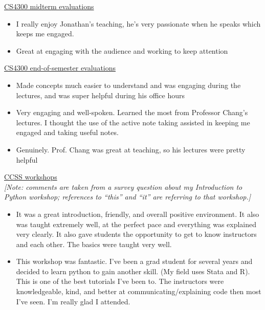 \documentclass[11pt,letterpaper]{article}
\begin{document}

\noindent\underline{CS4300 midterm evaluations}
\begin{itemize}
    \item I really enjoy Jonathan's teaching, he's very passionate when he speaks which keeps me engaged.
    \item Great at engaging with the audience and working to keep attention
\end{itemize}

\noindent\underline{CS4300 end-of-semester evaluations}
\begin{itemize}
    \item Made concepts much easier to understand and was engaging during the lectures, and was super helpful during his office hours
    \item Very engaging and well-spoken. Learned the most from Professor Chang's lectures. I thought the use of the active note taking assisted in keeping me engaged and taking useful notes.
    \item Genuinely. Prof. Chang was great at teaching, so his lectures were pretty helpful
\end{itemize}

\noindent\underline{CCSS workshops}\\
\emph{[Note: comments are taken from a survey question about my Introduction to Python workshop; references to ``this'' and ``it'' are referring to that workshop.]}
\begin{itemize}
    \item It was a great introduction, friendly, and overall positive environment. It also was taught extremely well, at the perfect pace and everything was explained very clearly. It also gave students the opportunity to get to know instructors and each other. The basics were taught very well.
    \item This workshop was fantastic. I've been a grad student for several years and decided to learn python to gain another skill. (My field uses Stata and R). This is one of the best tutorials I've been to. The instructors were knowledgeable, kind, and better at communicating/explaining code then most I've seen. I'm really glad I attended.
\end{itemize}

\else
%
\fi
\end{document}
